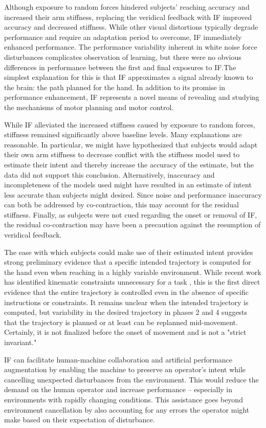 \documentclass{frontiersSCNS} %
\begin{document}
Although exposure to random forces hindered subjects’ reaching accuracy and increased their arm stiffness, replacing the veridical feedback with IF improved accuracy and decreased stiffness. While other visual distortions typically degrade performance and require an adaptation period to overcome, IF immediately enhanced performance. The performance variability inherent in white noise force disturbances complicates observation of learning, but there were no obvious differences in performance between the first and final exposures to IF.The simplest explanation for this is that IF approximates a signal already known to the brain: the path planned for the hand. In addition to its promise in performance enhancement, IF represents a novel means of revealing and studying the mechanisms of motor planning and motor control.

While IF alleviated the increased stiffness caused by exposure to random forces, stiffness remained significantly above baseline levels. Many explanations are reasonable. In particular, we might have hypothesized that subjects would adapt their own arm stiffness to decrease conflict with the stiffness model used to estimate their intent and thereby increase the accuracy of the estimate, but the data did not support this conclusion. Alternatively, inaccuracy and incompleteness of the models used might have resulted in an estimate of intent less accurate than subjects might desired. Since noise and performance inaccuracy can both be addressed by co-contraction, this may account for the residual stiffness. Finally, as subjects were not cued regarding the onset or removal of IF, the residual co-contraction may have been a precaution against the resumption of veridical feedback.

The ease with which subjects could make use of their estimated intent provides strong preliminary evidence that a specific intended trajectory is computed for the hand even when reaching in a highly variable environment. While recent work has identified kinematic constraints unnecessary for a task \citep{mistry2013optimal}, this is the first direct evidence that the entire trajectory is controlled even in the absence of specific instructions or constraints. It remains unclear when the intended trajectory is computed, but variability in the desired trajectory in phases 2 and 4 suggests that the trajectory is planned or at least can be replanned mid-movement. Certainly, it is not finalized before the onset of movement and is not a "strict invariant."

IF can facilitate human-machine collaboration and artificial performance augmentation by enabling the machine to preserve an operator's intent while cancelling unexpected disturbances from the environment. This would reduce the demand on the human operator and increase performance -- especially in environments with rapidly changing conditions. This assistance goes beyond environment cancellation by also accounting for any errors the operator might make based on their expectation of disturbance.
\end{document}
